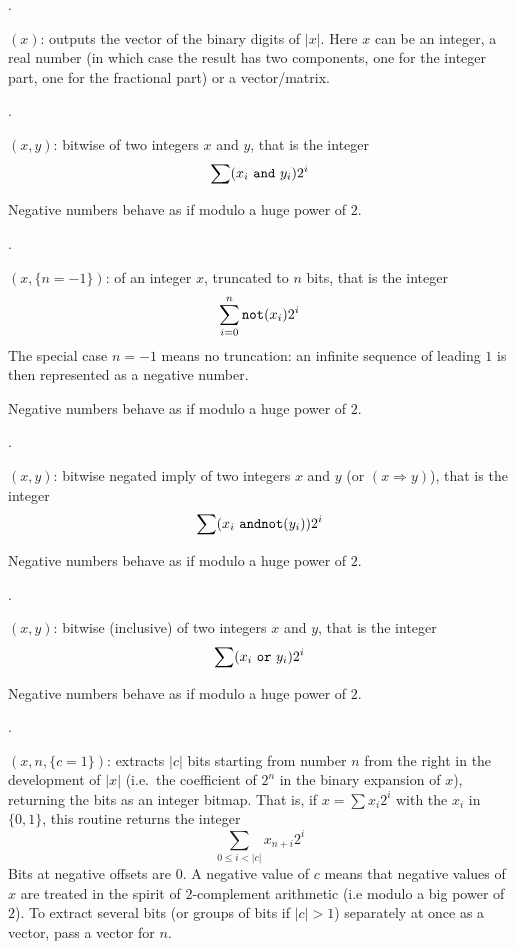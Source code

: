 .

$(x)$: outputs the vector of the binary digits of $|x|$.
Here $x$ can be an integer, a real number (in which case the result has two
components, one for the integer part, one for the fractional part) or a
vector/matrix.

.

$(x,y)$: bitwise  of two
integers $x$ and $y$, that is the integer
$$\sum (x_i~{\tt and}~y_i) 2^i$$

Negative numbers behave as if modulo a huge power of $2$.

.

$(x,\{n=-1\})$:  of an integer $x$,
truncated to $n$ bits, that is the integer
$$\sum_{i=0}^n {\tt not}(x_i) 2^i$$
The special case $n=-1$ means no truncation: an infinite sequence of
leading $1$ is then represented as a negative number.

Negative numbers behave as if modulo a huge power of $2$.

.

$(x,y)$: bitwise negated imply of two integers $x$
and $y$ (or  $(x \Rightarrow y)$), that is the integer
$$\sum (x_i~{\tt and not}(y_i)) 2^i$$

Negative numbers behave as if modulo a huge power of $2$.

.

$(x,y)$: bitwise (inclusive)
 of two integers $x$ and $y$, that is the integer
$$\sum (x_i~{\tt or}~y_i) 2^i$$

Negative numbers behave as if modulo a huge power of $2$.

.

$(x,n,\{c=1\})$: extracts $|c|$ bits starting from
number $n$ from the right in the development of $|x|$ (i.e.~the coefficient
of $2^n$ in the binary expansion of $x$), returning the bits as an integer
bitmap. That is, if $x = \sum x_i 2^i$ with the $x_i$ in $\{0,1\}$, this
routine returns the integer
$$ \sum_{0\leq i < |c|} x_{n + i} 2^i $$
Bits at negative offsets are 0. A negative value of $c$ means that negative
values of $x$ are treated in the spirit of $2$-complement arithmetic (i.e
modulo a big power of $2$). To extract several bits (or groups of bits if
$|c|>1$) separately at once as a vector, pass a vector for $n$.

